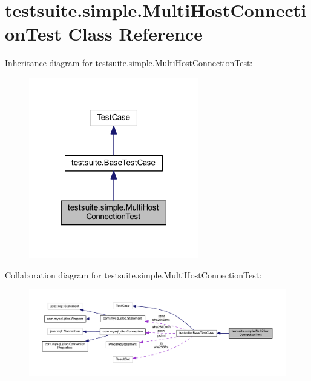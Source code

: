 \hypertarget{classtestsuite_1_1simple_1_1_multi_host_connection_test}{}\section{testsuite.\+simple.\+Multi\+Host\+Connection\+Test Class Reference}
\label{classtestsuite_1_1simple_1_1_multi_host_connection_test}


Inheritance diagram for testsuite.\+simple.\+Multi\+Host\+Connection\+Test\+:
\nopagebreak
\begin{figure}[H]
\begin{center}
\leavevmode
\includegraphics[width=210pt]{classtestsuite_1_1simple_1_1_multi_host_connection_test__inherit__graph}
\end{center}
\end{figure}


Collaboration diagram for testsuite.\+simple.\+Multi\+Host\+Connection\+Test\+:
\nopagebreak
\begin{figure}[H]
\begin{center}
\leavevmode
\includegraphics[width=350pt]{classtestsuite_1_1simple_1_1_multi_host_connection_test__coll__graph}
\end{center}
\end{figure}

